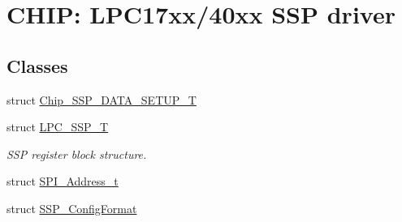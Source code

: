 \hypertarget{group__SSP__17XX__40XX}{}\section{C\+H\+IP\+: L\+P\+C17xx/40xx S\+SP driver}
\label{group__SSP__17XX__40XX}
\subsection*{Classes}
\begin{DoxyCompactItemize}
\item 
struct \hyperlink{structChip__SSP__DATA__SETUP__T}{Chip\+\_\+\+S\+S\+P\+\_\+\+D\+A\+T\+A\+\_\+\+S\+E\+T\+U\+P\+\_\+T}
\item 
struct \hyperlink{structLPC__SSP__T}{L\+P\+C\+\_\+\+S\+S\+P\+\_\+T}
\begin{DoxyCompactList}\small\item\em S\+SP register block structure. \end{DoxyCompactList}\item 
struct \hyperlink{structSPI__Address__t}{S\+P\+I\+\_\+\+Address\+\_\+t}
\item 
struct \hyperlink{structSSP__ConfigFormat}{S\+S\+P\+\_\+\+Config\+Format}
\end{DoxyCompactItemize}
